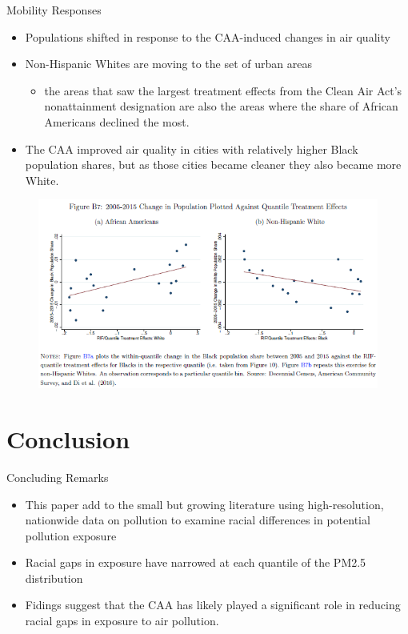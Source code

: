\documentclass[dvipdfmx,12pt]{beamer}
\begin{document}
\begin{frame}{Mobility Responses}
  \begin{itemize}
    \item Populations shifted in response to the CAA-induced changes in air quality
    \item Non-Hispanic Whites are moving to the set of urban areas
    \begin{itemize}
      \item the areas that saw the largest treatment effects from the Clean Air Act's nonattainment designation are also the areas where the share of African Americans declined the most.
    \end{itemize}
    \item The CAA improved air quality in cities with relatively higher Black population shares, but as those cities became cleaner they also became more White.
  \end{itemize}
\end{frame}

\begin{frame}{}
  \begin{figure}
    \centering
    \includegraphics[scale = .6]{FB7.png}
  \end{figure}
\end{frame}

\section{Conclusion}
\frame{\sectionpage}
\begin{frame}{Concluding Remarks}
  \begin{itemize}
    \item This paper add to the small but growing literature using high-resolution, nationwide data on pollution to examine racial differences in potential pollution exposure
    \item Racial gaps in exposure have narrowed at each quantile of the PM2.5 distribution
    \item Fidings suggest that the CAA has likely played a significant role in reducing racial gaps in exposure to air pollution.
  \end{itemize}
\end{frame}
\end{document}
